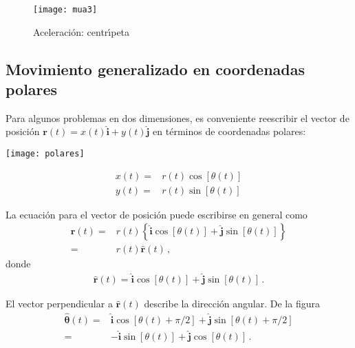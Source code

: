 \begin{frame}
  \begin{figure}
    \centering
    \texttt{[image: mua3]}
    \caption{Aceleraci\'on: centr\'\i peta}
    \label{fig:mua3}
  \end{figure}


\end{frame}

\subsection{Movimiento generalizado en coordenadas polares}


Para algunos problemas en dos dimensiones, es conveniente reescribir el vector de posición $\mathbf{r}(t)=x(t)\hat{\mathbf{i}}+y(t)\hat{\mathbf{j}}$ en términos de coordenadas polares:

\begin{frame}
\noindent
\begin{minipage}{0.2\textwidth}
\texttt{[image: polares]}  
\end{minipage}
\begin{minipage}{0.8\textwidth}
  \begin{align}
    \label{eq:polares}
    x(t)=&r(t)\cos \left[ \theta(t) \right]\nonumber\\
    y(t)=&r(t)\sin \left[ \theta(t) \right]
  \end{align}
\end{minipage}
\end{frame}


La ecuaci\'on para el vector de posici\'on puede escribirse en general como
\begin{align}
\label{eq:rpol}
  \mathbf{r}(t)=&r(t)\left\{\hat{\mathbf{i}}\cos[\theta(t)]+\hat{\mathbf{j}}\sin[\theta(t)]\right\}\nonumber\\
=&r(t)\hat{\mathbf{r}}(t)\,,
\end{align}
donde
\begin{align}
\label{eq:runit}
  \hat{\mathbf{r}}(t)=\hat{\mathbf{i}}\cos[\theta(t)]+\hat{\mathbf{j}}\sin[\theta(t)]\,.
\end{align}


El vector perpendicular a $\hat{\mathbf{r}}(t)$ describe la dirección angular. De la figura %
\begin{align}
\label{eq:thetaunit}
  \hat{\boldsymbol{\theta}}(t)=&\hat{\mathbf{i}}\cos[\theta(t)+\pi/2]+\hat{\mathbf{j}}\sin[\theta(t)+\pi/2]\nonumber\\
=&-\hat{\mathbf{i}}\sin[\theta(t)]+\hat{\mathbf{j}}\cos[\theta(t)]\,.
\end{align}


